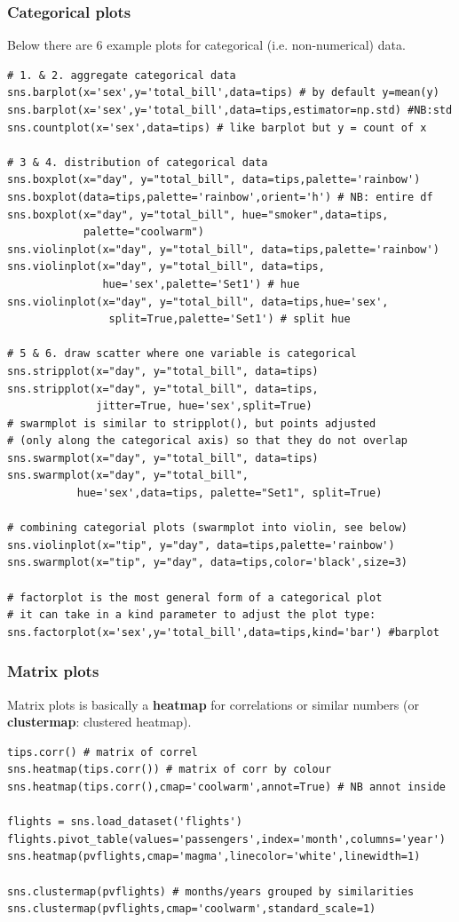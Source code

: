 \documentclass[12pt]{article}
\begin{document}
\subsubsection{Categorical plots}
Below there are 6 example plots for categorical (i.e. non-numerical) data.
\begin{lstlisting}
# 1. & 2. aggregate categorical data
sns.barplot(x='sex',y='total_bill',data=tips) # by default y=mean(y)
sns.barplot(x='sex',y='total_bill',data=tips,estimator=np.std) #NB:std
sns.countplot(x='sex',data=tips) # like barplot but y = count of x

# 3 & 4. distribution of categorical data
sns.boxplot(x="day", y="total_bill", data=tips,palette='rainbow')
sns.boxplot(data=tips,palette='rainbow',orient='h') # NB: entire df
sns.boxplot(x="day", y="total_bill", hue="smoker",data=tips,
            palette="coolwarm")
sns.violinplot(x="day", y="total_bill", data=tips,palette='rainbow')
sns.violinplot(x="day", y="total_bill", data=tips,
               hue='sex',palette='Set1') # hue
sns.violinplot(x="day", y="total_bill", data=tips,hue='sex',
                split=True,palette='Set1') # split hue

# 5 & 6. draw scatter where one variable is categorical
sns.stripplot(x="day", y="total_bill", data=tips)
sns.stripplot(x="day", y="total_bill", data=tips,
              jitter=True, hue='sex',split=True)
# swarmplot is similar to stripplot(), but points adjusted 
# (only along the categorical axis) so that they do not overlap
sns.swarmplot(x="day", y="total_bill", data=tips)
sns.swarmplot(x="day", y="total_bill",
           hue='sex',data=tips, palette="Set1", split=True)

# combining categorial plots (swarmplot into violin, see below)
sns.violinplot(x="tip", y="day", data=tips,palette='rainbow')
sns.swarmplot(x="tip", y="day", data=tips,color='black',size=3)

# factorplot is the most general form of a categorical plot 
# it can take in a kind parameter to adjust the plot type:
sns.factorplot(x='sex',y='total_bill',data=tips,kind='bar') #barplot
\end{lstlisting}

\subsubsection{Matrix plots}
Matrix plots is basically a \textbf{heatmap} for correlations or similar numbers (or \textbf{clustermap}: clustered heatmap).
\begin{lstlisting}
tips.corr() # matrix of correl
sns.heatmap(tips.corr()) # matrix of corr by colour
sns.heatmap(tips.corr(),cmap='coolwarm',annot=True) # NB annot inside

flights = sns.load_dataset('flights')
flights.pivot_table(values='passengers',index='month',columns='year')
sns.heatmap(pvflights,cmap='magma',linecolor='white',linewidth=1) 

sns.clustermap(pvflights) # months/years grouped by similarities
sns.clustermap(pvflights,cmap='coolwarm',standard_scale=1) 
\end{lstlisting}
\end{document}
